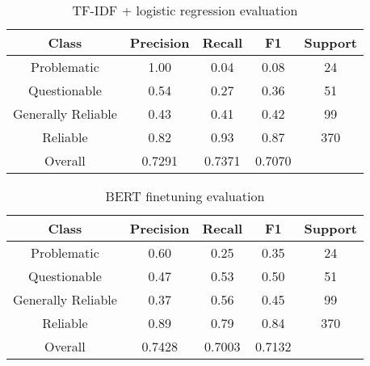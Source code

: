 \begin{table}[!h]
    \begin{minipage}[t]{\linewidth}
        \centering
        \begin{tabular}{|| c | c | c | c | c ||}
            \hline
            Class              & Precision & Recall & F1     & Support \\
            \hline
            \hline
            Problematic        & 1.00      & 0.04   & 0.08   & 24      \\
            \hline
            Questionable       & 0.54      & 0.27   & 0.36   & 51      \\
            \hline
            Generally Reliable & 0.43      & 0.41   & 0.42   & 99      \\
            \hline
            Reliable           & 0.82      & 0.93   & 0.87   & 370     \\
            \hline
            Overall            & 0.7291    & 0.7371 & 0.7070 &         \\
            \hline
        \end{tabular}
        \caption{TF-IDF + logistic regression evaluation}
        \label{table:tfidf_logistic}
    \end{minipage}
\end{table}


\begin{table}[!h]
    \centering
    \begin{minipage}[t]{\linewidth}
        \centering
        \begin{tabular}{|| c | c | c | c | c ||}
            \hline
            Class              & Precision & Recall & F1     & Support \\
            \hline
            \hline
            Problematic        & 0.60      & 0.25   & 0.35   & 24      \\
            \hline
            Questionable       & 0.47      & 0.53   & 0.50   & 51      \\
            \hline
            Generally Reliable & 0.37      & 0.56   & 0.45   & 99      \\
            \hline
            Reliable           & 0.89      & 0.79   & 0.84   & 370     \\
            \hline
            Overall            & 0.7428    & 0.7003 & 0.7132 &         \\
            \hline
        \end{tabular}
        \caption{BERT finetuning evaluation}
        \label{table:bert-finetuning}
    \end{minipage}
\end{table}


